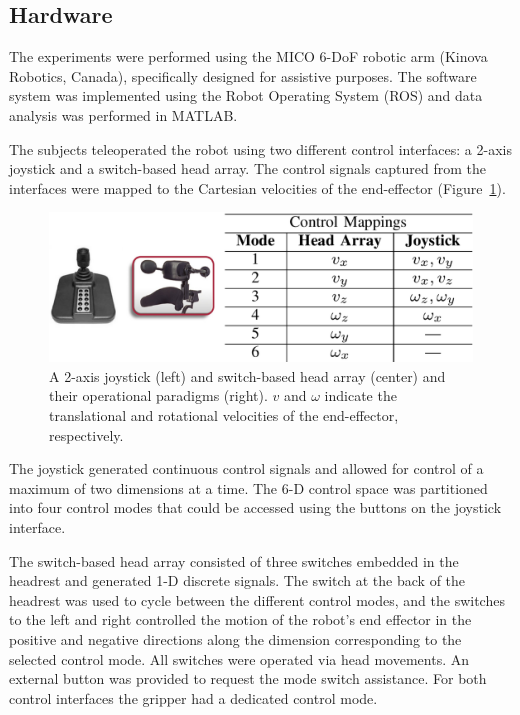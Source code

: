 \documentclass[natbib, twocolumn]{svjour3}          %
\begin{document}
\subsection{Hardware}\label{ssec:hardware}
The experiments were performed using the MICO 6-DoF robotic arm (Kinova Robotics, Canada), specifically designed for assistive purposes. The software system was implemented using the Robot Operating System (ROS) and data analysis was performed in MATLAB. 

The subjects teleoperated the robot using two different control interfaces: a 2-axis joystick and a switch-based head array. The control signals captured from the interfaces were mapped to the Cartesian velocities of the end-effector (Figure~\ref{fig:interfaces}).
\begin{figure}[b]
	\centering
	\includegraphics[width = 1\hsize, height = 0.13\vsize]{Fig6.eps}
	\caption{A 2-axis joystick (left) and switch-based head array (center) and their operational paradigms (right). $v$ and $\omega$ indicate the translational and rotational velocities of the end-effector, respectively.}
	\label{fig:interfaces}
\end{figure}

The joystick generated continuous control signals and allowed for control of a maximum of two dimensions at a time. The 6-D control space was partitioned into four control modes that could be accessed using the buttons on the joystick interface. 

The switch-based head array consisted of three switches embedded in the headrest and generated 1-D discrete signals. The switch at the back of the headrest was used to cycle between the different control modes, and the switches to the left and right controlled the motion of the robot's end effector in the positive and negative directions along the dimension corresponding to the selected control mode. All switches were operated via head movements.
An external button was provided to request the mode switch assistance. For both control interfaces the gripper had a dedicated control mode. 
\end{document}
